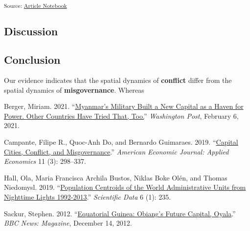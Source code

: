 \documentclass[
  letterpaper,
  DIV=11,
  numbers=noendperiod]{scrartcl}
\newlength{\cslhangindent}
\newenvironment{CSLReferences}[2] %
 {\begin{list}{}{%
  \setlength{\itemindent}{0pt}
  \setlength{\leftmargin}{0pt}
  \setlength{\parsep}{0pt}
  \ifodd #1
   \setlength{\leftmargin}{\cslhangindent}
   \setlength{\itemindent}{-1\cslhangindent}
  \fi
  \setlength{\itemsep}{#2\baselineskip}}}
 {\end{list}}
\begin{document}
\textsubscript{Source:
\href{https://jpowerj.github.io/gis-manuscript-template/index.qmd.html}{Article
Notebook}}

\subsection{Discussion}\label{discussion}

\subsection{Conclusion}\label{conclusion}

Our evidence indicates that the spatial dynamics of \textbf{conflict}
differ from the spatial dynamics of \textbf{misgovernance}. Whereas

\protect{}\label{refs}
\begin{CSLReferences}{1}{0}
Berger, Miriam. 2021.
{``\href{https://www.washingtonpost.com/world/2021/02/06/myanmars-military-built-new-capital-haven-power-other-countries-have-tried-that-too/}{Myanmar's
Military Built a New Capital as a Haven for Power. {Other} Countries
Have Tried That, Too.}''} \emph{Washington Post}, February 6, 2021.

Campante, Filipe R., Quoc-Anh Do, and Bernardo Guimaraes. 2019.
{``\href{https://doi.org/10.1257/app.20170111}{Capital {Cities},
{Conflict}, and {Misgovernance}}.''} \emph{American Economic Journal:
Applied Economics} 11 (3): 298--337.

Hall, Ola, Maria Francisca Archila Bustos, Niklas Boke Olén, and Thomas
Niedomysl. 2019.
{``\href{https://doi.org/10.1038/s41597-019-0250-z}{Population Centroids
of the World Administrative Units from Nighttime Lights 1992-2013}.''}
\emph{Scientific Data} 6 (1): 235.

Sackur, Stephen. 2012.
{``\href{https://www.bbc.com/news/magazine-20731448}{Equatorial
{Guinea}: {Obiang}'s Future Capital, {Oyala}}.''} \emph{BBC News:
Magazine}, December 14, 2012.

\end{CSLReferences}
\end{document}

